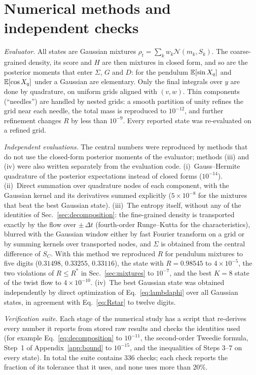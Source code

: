 \section{Numerical methods and independent checks}
\label{app:methods}

\emph{Evaluator.} All states are Gaussian mixtures $\rho_t = \sum_k w_k\mathcal N(m_k,S_k)$. The coarse-grained density, its score and $H$ are then mixtures in closed form, and so are the posterior moments that enter $\Sigma$, $G$ and $D$: for the pendulum $\mathbb{E}[\sin X_q]$ and $\mathbb{E}[\cos X_q]$ under a Gaussian are elementary. Only the final integrals over $y$ are done by quadrature, on uniform grids aligned with $(v,w)$. Thin components (``needles'') are handled by nested grids: a smooth partition of unity refines the grid near each needle, the total mass is reproduced to $10^{-12}$, and further refinement changes $R$ by less than $10^{-9}$. Every reported state was re-evaluated on a refined grid.

\emph{Independent evaluations.} The central numbers were reproduced by methods that do not use the closed-form posterior moments of the evaluator; methods (iii) and (iv) were also written separately from the evaluation code.
(i)~Gauss--Hermite quadrature of the posterior expectations instead of closed forms ($10^{-14}$).
(ii)~Direct summation over quadrature nodes of each component, with the Gaussian kernel and its derivatives summed explicitly ($5\times10^{-8}$ for the mixtures that beat the best Gaussian state).
(iii)~The entropy itself, without any of the identities of Sec.~\ref{sec:decomposition}: the fine-grained density is transported exactly by the flow over $\pm\,\Delta t$ (fourth-order Runge--Kutta for the characteristics), blurred with the Gaussian window either by fast Fourier transform on a grid or by summing kernels over transported nodes, and $\Sigma$ is obtained from the central difference of $S_C$. With this method we reproduced $R$ for pendulum mixtures to five digits ($0.31498$, $0.33255$, $0.33116$), the state with $R = 0.98545$ to $4\times10^{-5}$, the two violations of $R \leq R^*$ in Sec.~\ref{sec:mixtures} to $10^{-7}$, and the best $K = 8$ state of the twist flow to $4\times10^{-10}$.
(iv)~The best Gaussian state was obtained independently by direct optimization of Eq.~\eqref{eq:lambdaphi} over all Gaussian states, in agreement with Eq.~\eqref{eq:Rstar} to twelve digits.

\emph{Verification suite.} Each stage of the numerical study has a script that re-derives every number it reports from stored raw results and checks the identities used (for example Eq.~\eqref{eq:decomposition} to $10^{-11}$, the second-order Tweedie formula, Step~1 of Appendix~\ref{app:bound} to $10^{-15}$, and the inequalities of Steps 3--7 on every state). In total the suite contains 336 checks; each check reports the fraction of its tolerance that it uses, and none uses more than $20\%$.

